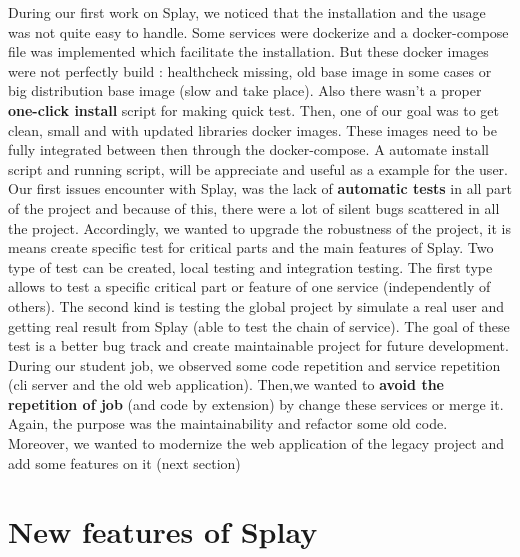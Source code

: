 \documentclass{eplmastersthesis}
\begin{document}
      During our first work on Splay, we noticed that the installation and the
      usage was not quite easy to handle. Some services were dockerize and a
      docker-compose file was implemented which facilitate the installation.
      But these docker images were not perfectly build : healthcheck missing,
      old base image in some cases or big distribution base image (slow and
      take place). Also there wasn't a proper \textbf{one-click install}
      script for making quick test. Then, one of our goal was to get clean,
      small and with updated libraries docker images. These images need to be
      fully integrated between then through the docker-compose. A automate
      install script and running script, will be appreciate and useful as a
      example for the user.\\

      Our first issues encounter with Splay, was the lack of
      \textbf{automatic tests} in all part of the project and because of this,
      there were a lot of silent bugs scattered in all the project.
      Accordingly, we wanted to upgrade the robustness of the project,
      it is means create specific test for critical parts and the main features
      of Splay. Two type of test can be created, local testing and integration
      testing. The first type allows to test a specific critical part or
      feature of one service (independently of others). The second kind is
      testing the global project by simulate a real user and getting real
      result from Splay (able to test the chain of service). The goal of these
      test is a better bug track and create maintainable project for future
      development.\\

      During our student job, we observed some code repetition and service
      repetition (cli server and the old web application). Then,we wanted
      to \textbf{avoid the repetition of job} (and code by extension) by
      change these services or merge it. Again, the purpose was the
      maintainability and refactor some old code. Moreover, we wanted to
      modernize the web application of the legacy project and add some
      features on it (next section)


    \section{New features of Splay}
\end{document}
